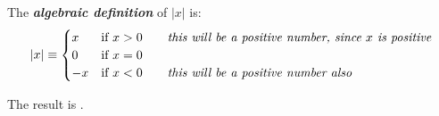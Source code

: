 \begin{center}
    \begin{tcolorbox}[width=5in]
    The {\bfseries\itshape algebraic definition} of $|x|$ is:
    \[ 
        |x| \equiv
        \begin{cases} 
            x &  \text{if } x>0 \qquad\text{\itshape this will be a positive number, since $x$ is positive}\\
            0 &  \text{if } x=0 \\
            -x & \text{if } x<0 \qquad\text{\itshape this will be a positive number also}
        \end{cases}
    \]
    
    The result is .
    \end{tcolorbox}
\end{center}
